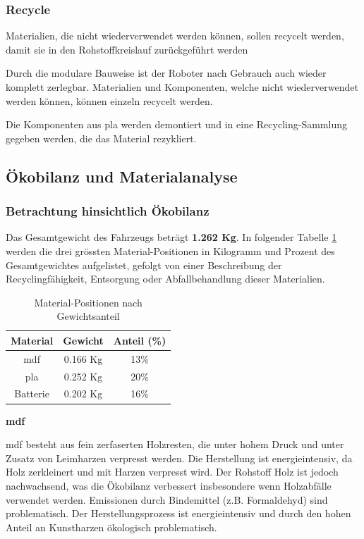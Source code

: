 \subsubsection{Recycle}

Materialien, die nicht wiederverwendet werden können, sollen
recycelt werden, damit sie in den Rohstoffkreislauf zurückgeführt werden

Durch die modulare Bauweise ist der Roboter nach Gebrauch auch wieder komplett zerlegbar. Materialien und Komponenten, welche nicht wiederverwendet werden können, können einzeln recycelt werden.

Die Komponenten aus \acrshort{pla} werden demontiert und in eine Recycling-Sammlung gegeben werden, die das Material rezykliert.


\subsection{Ökobilanz und Materialanalyse}

\subsubsection{Betrachtung hinsichtlich Ökobilanz}
Das Gesamtgewicht des Fahrzeugs beträgt \textbf{1.262 Kg}. In folgender Tabelle \ref{tab:kritische-mat} werden die drei grössten Material-Positionen in Kilogramm und Prozent des Gesamtgewichtes aufgelistet, gefolgt von einer Beschreibung der Recyclingfähigkeit, Entsorgung oder Abfallbehandlung dieser Materialien.

\begin{table}[H]
    \centering
    \begin{tabular}{c c c}
    \toprule
    Material & Gewicht  & Anteil (\%)\\
    \midrule
    \acrshort{mdf} & 0.166 Kg & 13\% \\
    \acrshort{pla} & 0.252 Kg & 20\% \\
    Batterie & 0.202 Kg & 16\%   \\
    \bottomrule
    \end{tabular}
    \caption{Material-Positionen nach Gewichtsanteil}
    \label{tab:kritische-mat}
\end{table}


\textbf{\acrfull{mdf}}

\acrshort{mdf} besteht aus fein zerfaserten Holzresten, die unter hohem Druck und unter Zusatz von Leimharzen verpresst werden. Die Herstellung ist energieintensiv, da Holz zerkleinert und mit Harzen verpresst wird. Der Rohstoff Holz ist jedoch nachwachsend, was die Ökobilanz verbessert insbesondere wenn Holzabfälle verwendet werden. Emissionen durch Bindemittel (z.B. Formaldehyd) sind problematisch.\cite{support-2024}
Der Herstellungsprozess ist energieintensiv und durch den hohen Anteil an Kunstharzen ökologisch problematisch.

